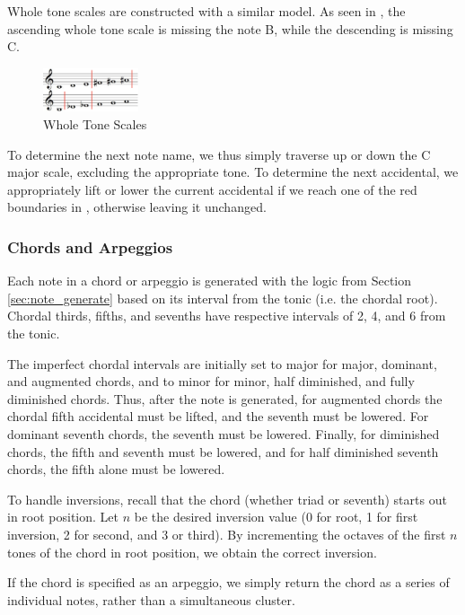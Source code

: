 \documentclass{article}
\begin{document}
Whole tone scales are constructed with a similar model. As seen in , the ascending whole tone scale is missing the note B, while the descending is missing C.

\begin{figure}[h!]
\centering
\includegraphics[width=0.25\textwidth]{images/whole_tone}
\caption{Whole Tone Scales}
\label{whole_tone}
\vspace{-5mm}
\end{figure}

To determine the next note name, we thus simply traverse up or down the C major scale, excluding the appropriate tone. To determine the next accidental, we appropriately lift or lower the current accidental if we reach one of the red boundaries in , otherwise leaving it unchanged.

\subsubsection{Chords and Arpeggios}
\label{sec:chord_expansion}
Each note in a chord or arpeggio is generated with the logic from Section \ref{sec:note_generate} based on its interval from the tonic (i.e. the chordal root). Chordal thirds, fifths, and sevenths have respective intervals of 2, 4, and 6 from the tonic.

The imperfect chordal intervals are initially set to major for major, dominant, and augmented chords, and to minor for minor, half diminished, and fully diminished chords. Thus, after the note is generated, for augmented chords the chordal fifth accidental must be lifted, and the seventh must be lowered. For dominant seventh chords, the seventh must be lowered. Finally, for diminished chords, the fifth and seventh must be lowered, and for half diminished seventh chords, the fifth alone must be lowered.

To handle inversions, recall that the chord (whether triad or seventh) starts out in root position. Let $n$ be the desired inversion value (0 for root, 1 for first inversion, 2 for second, and 3 or third). By incrementing the octaves of the first $n$ tones of the chord in root position, we obtain the correct inversion.

If the chord is specified as an arpeggio, we simply return the chord as a series of individual notes, rather than a simultaneous cluster.
\end{document}
